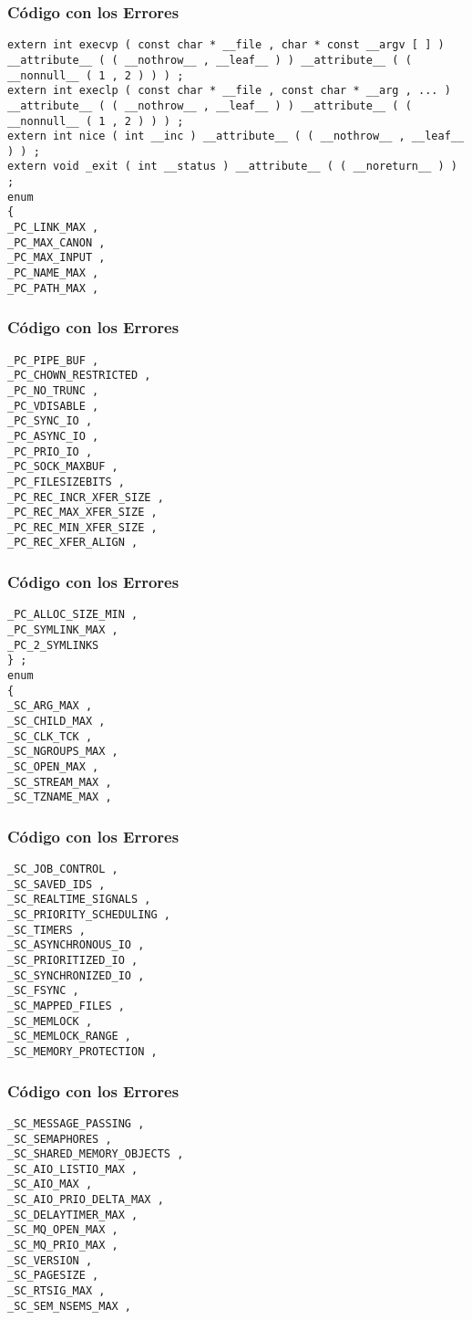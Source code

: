 \documentclass{beamer}
\begin{document}
\begin{frame}[fragile]
\frametitle{C\'odigo con los Errores}
\begin{lstlisting}[style=CStyle]
extern int execvp ( const char * __file , char * const __argv [ ] ) 
__attribute__ ( ( __nothrow__ , __leaf__ ) ) __attribute__ ( ( __nonnull__ ( 1 , 2 ) ) ) ; 
extern int execlp ( const char * __file , const char * __arg , ... ) 
__attribute__ ( ( __nothrow__ , __leaf__ ) ) __attribute__ ( ( __nonnull__ ( 1 , 2 ) ) ) ; 
extern int nice ( int __inc ) __attribute__ ( ( __nothrow__ , __leaf__ ) ) ; 
extern void _exit ( int __status ) __attribute__ ( ( __noreturn__ ) ) ; 
enum 
{ 
_PC_LINK_MAX , 
_PC_MAX_CANON , 
_PC_MAX_INPUT , 
_PC_NAME_MAX , 
_PC_PATH_MAX , 
\end{lstlisting}
\end{frame}
\begin{frame}[fragile]
\frametitle{C\'odigo con los Errores}
\begin{lstlisting}[style=CStyle]
_PC_PIPE_BUF , 
_PC_CHOWN_RESTRICTED , 
_PC_NO_TRUNC , 
_PC_VDISABLE , 
_PC_SYNC_IO , 
_PC_ASYNC_IO , 
_PC_PRIO_IO , 
_PC_SOCK_MAXBUF , 
_PC_FILESIZEBITS , 
_PC_REC_INCR_XFER_SIZE , 
_PC_REC_MAX_XFER_SIZE , 
_PC_REC_MIN_XFER_SIZE , 
_PC_REC_XFER_ALIGN , 
\end{lstlisting}
\end{frame}
\begin{frame}[fragile]
\frametitle{C\'odigo con los Errores}
\begin{lstlisting}[style=CStyle]
_PC_ALLOC_SIZE_MIN , 
_PC_SYMLINK_MAX , 
_PC_2_SYMLINKS 
} ; 
enum 
{ 
_SC_ARG_MAX , 
_SC_CHILD_MAX , 
_SC_CLK_TCK , 
_SC_NGROUPS_MAX , 
_SC_OPEN_MAX , 
_SC_STREAM_MAX , 
_SC_TZNAME_MAX , 
\end{lstlisting}
\end{frame}
\begin{frame}[fragile]
\frametitle{C\'odigo con los Errores}
\begin{lstlisting}[style=CStyle]
_SC_JOB_CONTROL , 
_SC_SAVED_IDS , 
_SC_REALTIME_SIGNALS , 
_SC_PRIORITY_SCHEDULING , 
_SC_TIMERS , 
_SC_ASYNCHRONOUS_IO , 
_SC_PRIORITIZED_IO , 
_SC_SYNCHRONIZED_IO , 
_SC_FSYNC , 
_SC_MAPPED_FILES , 
_SC_MEMLOCK , 
_SC_MEMLOCK_RANGE , 
_SC_MEMORY_PROTECTION , 
\end{lstlisting}
\end{frame}
\begin{frame}[fragile]
\frametitle{C\'odigo con los Errores}
\begin{lstlisting}[style=CStyle]
_SC_MESSAGE_PASSING , 
_SC_SEMAPHORES , 
_SC_SHARED_MEMORY_OBJECTS , 
_SC_AIO_LISTIO_MAX , 
_SC_AIO_MAX , 
_SC_AIO_PRIO_DELTA_MAX , 
_SC_DELAYTIMER_MAX , 
_SC_MQ_OPEN_MAX , 
_SC_MQ_PRIO_MAX , 
_SC_VERSION , 
_SC_PAGESIZE , 
_SC_RTSIG_MAX , 
_SC_SEM_NSEMS_MAX , 
\end{lstlisting}
\end{frame}
\end{document}
